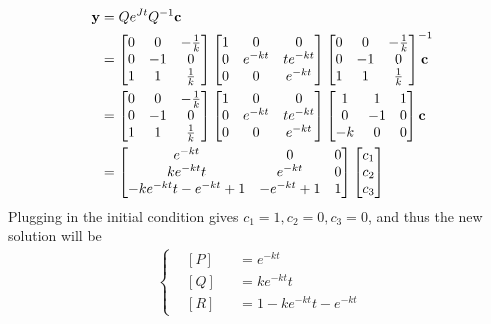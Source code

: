 \begin{align*}
\textbf{y} &= Qe^{Jt}Q^{-1}\textbf{c} \\
&= \begin{bmatrix}
0 & 0 & -\frac{1}{k}\\
0 & -1 & 0 \\
1 & 1 & \frac{1}{k}
\end{bmatrix}
\begin{bmatrix}
1 & 0 & 0 \\
0 & e^{-kt} & te^{-kt} \\
0 & 0 & e^{-kt}
\end{bmatrix}
\begin{bmatrix}
0 & 0 & -\frac{1}{k}\\
0 & -1 & 0 \\
1 & 1 & \frac{1}{k}
\end{bmatrix}^{\mathrlap{-1}}
\textbf{c} \\
&= \begin{bmatrix}
0 & 0 & -\frac{1}{k}\\
0 & -1 & 0 \\
1 & 1 & \frac{1}{k}
\end{bmatrix}
\begin{bmatrix}
1 & 0 & 0 \\
0 & e^{-kt} & te^{-kt} \\
0 & 0 & e^{-kt}
\end{bmatrix}
\begin{bmatrix}
1 & 1 & 1\\ 
0 & -1 & 0\\ 
-k & 0 & 0
\end{bmatrix}
\textbf{c}\\
&= 
\begin{bmatrix}
e^{-kt} & 0 & 0 \\ 
ke^{-kt}t & e^{-kt} & 0 \\ 
-ke^{-kt}t-e^{-kt}+1 & -e^{-kt}+1 & 1
\end{bmatrix}
\begin{bmatrix}
c_1 \\
c_2 \\
c_3
\end{bmatrix}
\end{align*}
Plugging in the initial condition gives $c_1 = 1, c_2 = 0, c_3 = 0$, and thus the new solution will be
\begin{align*}
\left\{\begin{alignedat}{2}
&[P]& &= e^{-kt} \\
&[Q]& &= ke^{-kt}t \\
&[R]& &= 1-ke^{-kt}t-e^{-kt} 
\end{alignedat}\right.
\end{align*}
